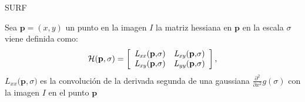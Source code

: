 \begin{frame}
\begin{block}{SURF}
\begin{itemize}
{\begin{equation*}
		    \label{eq:HessianMatrix}
		  \end{equation*}
		  Sea $\mathbf{p}=(x,y)$ un punto en la imagen $\mathit{I}$
		  la matriz hessiana en $\mathbf{p}$ en la escala $\sigma$ viene definida como:
		  \begin{equation*}
		    \mathcal{H}(\mathbf{p},\sigma)=\left[\begin{array}{cc}
		    \mathit{L_{xx}(\mathbf{p},}\sigma)\hphantom{} & \mathit{L_{xy}(\mathbf{p},}\sigma)\\
		    \mathit{L_{xy}(\mathbf{p},}\sigma)\hphantom{} & \mathit{L_{yy}(\mathbf{p},}\sigma)
		    \end{array}\right],
		  \end{equation*}
		  $\mathit{L_{xx}(\mathbf{p},}\sigma)$ es la convolución de la derivada segunda de una gaussiana $\frac{\partial^{2}}{\partial x^{2}}\mathit{g}(\sigma)$ con la imagen $\mathit{I}$ en el punto $\mathbf{p}$
		  }
	\end{itemize}
      \end{block}
  \end{frame}
% 
% 	       
